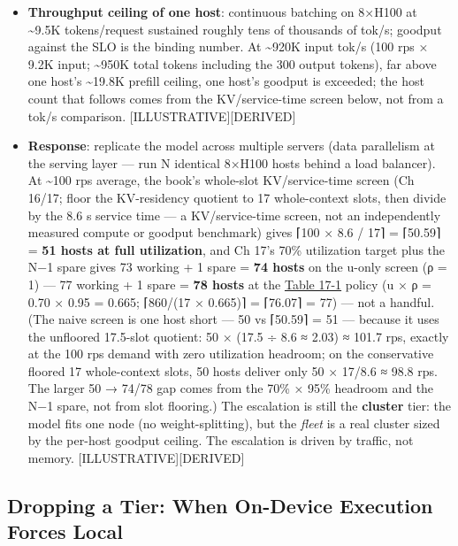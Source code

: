 \begin{itemize}
\item
  \textbf{Throughput ceiling of one host}: continuous batching on 8×H100
  at \textasciitilde9.5K tokens/request sustained roughly tens of
  thousands of tok/s; goodput against the SLO is the binding number. At
  \textasciitilde920K input tok/s (100 rps × 9.2K input;
  \textasciitilde950K total tokens including the 300 output tokens), far
  above one host's \textasciitilde19.8K prefill ceiling, one host's
  goodput is exceeded; the host count that follows comes from the
  KV/service-time screen below, not from a tok/s comparison.
  \mbox{{[}ILLUSTRATIVE{]}}\hspace{0pt}\mbox{{[}DERIVED{]}}
\item
  \textbf{Response}: replicate the model across multiple servers (data
  parallelism at the serving layer --- run N identical 8×H100 hosts
  behind a load balancer). At \textasciitilde100 rps average, the book's
  whole-slot KV/service-time screen (Ch 16/17; floor the KV-residency
  quotient to 17 whole-context slots, then divide by the 8.6 s service
  time --- a KV/service-time screen, not an independently measured
  compute or goodput benchmark) gives ⌈100 × 8.6 / 17⌉ = ⌈50.59⌉ =
  \textbf{51 hosts at full utilization}, and Ch 17's 70\% utilization
  target plus the N−1 spare gives 73 working + 1 spare = \textbf{74
  hosts} on the u-only screen (ρ = 1) --- 77 working + 1 spare =
  \textbf{78 hosts} at the \hyperref[tab:17.1]{Table 17-1} policy (u × ρ = 0.70 × 0.95 =
  0.665; ⌈860/(17 × 0.665)⌉ = ⌈76.07⌉ = 77) --- not a handful. (The
  naive screen is one host short --- 50 vs ⌈50.59⌉ = 51 --- because it
  uses the unfloored 17.5-slot quotient: 50 × (17.5 ÷ 8.6 ≈ 2.03) ≈
  101.7 rps, exactly at the 100 rps demand with zero utilization
  headroom; on the conservative floored 17 whole-context slots, 50 hosts
  deliver only 50 × 17/8.6 ≈ 98.8 rps. The larger 50 → 74/78 gap comes
  from the 70\% × 95\% headroom and the N−1 spare, not from slot
  flooring.) The escalation is still the \textbf{cluster} tier: the
  model fits one node (no weight-splitting), but the \emph{fleet} is a
  real cluster sized by the per-host goodput ceiling. The escalation is
  driven by traffic, not memory. \mbox{{[}ILLUSTRATIVE{]}}\hspace{0pt}\mbox{{[}DERIVED{]}}
\end{itemize}

\subsection{Dropping a Tier: When On-Device Execution Forces
Local}\label{dropping-a-tier-when-on-device-execution-forces-local}

